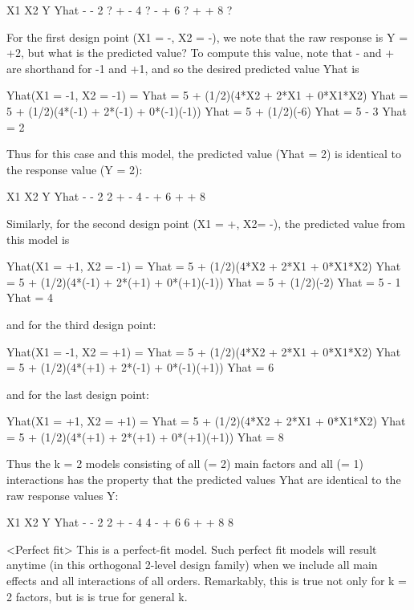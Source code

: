         X1     X2      Y      Yhat
         -      -      2       ?
         +      -      4       ?
         -      +      6       ?
         +      +      8       ?

For the first design point (X1 = -, X2 = -), we
note that the raw response is Y = +2, but what is
the predicted value?  To compute this value, note
that - and + are shorthand for -1 and +1, and so
the desired predicted value Yhat is

   Yhat(X1 = -1, X2 = -1) =
   Yhat = 5 + (1/2)(4*X2 + 2*X1 + 0*X1*X2)
   Yhat = 5 + (1/2)(4*(-1) + 2*(-1) + 0*(-1)(-1))
   Yhat = 5 + (1/2)(-6)
   Yhat = 5 - 3
   Yhat = 2

Thus for this case and this model, the predicted
value (Yhat = 2) is identical to the response
value (Y = 2):

        X1     X2      Y      Yhat
         -      -      2       2
         +      -      4
         -      +      6
         +      +      8

Similarly, for the second design point (X1 = +,
X2= -), the predicted value from this model is

   Yhat(X1 = +1, X2 = -1) =
   Yhat = 5 + (1/2)(4*X2 + 2*X1 + 0*X1*X2)
   Yhat = 5 + (1/2)(4*(-1) + 2*(+1) + 0*(+1)(-1))
   Yhat = 5 + (1/2)(-2)
   Yhat = 5 - 1
   Yhat = 4

and for the third design point:

   Yhat(X1 = -1, X2 = +1) =
   Yhat = 5 + (1/2)(4*X2 + 2*X1 + 0*X1*X2)
   Yhat = 5 + (1/2)(4*(+1) + 2*(-1) + 0*(-1)(+1))
   Yhat = 6

and for the last design point:

   Yhat(X1 = +1, X2 = +1) =
   Yhat = 5 + (1/2)(4*X2 + 2*X1 + 0*X1*X2)
   Yhat = 5 + (1/2)(4*(+1) + 2*(+1) + 0*(+1)(+1))
   Yhat = 8

Thus the k = 2 models consisting of all (= 2) main
factors and all (= 1) interactions has the property
that the predicted values Yhat are identical to
the raw response values Y:

        X1     X2      Y     Yhat
         -      -      2       2
         +      -      4       4
         -      +      6       6
         +      +      8       8

<Perfect fit>
This is a perfect-fit model.  Such perfect fit
models will result anytime (in this orthogonal
2-level design family) when we include all main
effects and all interactions of all orders.
Remarkably, this is true not only for k = 2
factors, but is is true for general k.

